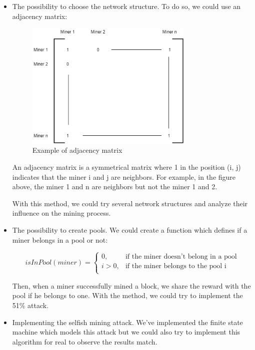 \begin{itemize}
  \item The possibility to choose the network structure. To do so, we could use an adjacency matrix: \newline

  \begin{figure}[ht]
  \centering
  \includegraphics[width=8cm]{Figures/matrix}
  \caption{Example of adjacency matrix}
  \end{figure}
  \medskip

  An adjacency matrix is a symmetrical matrix where 1 in the position (i, j) indicates that the miner i and j are neighbors. For example, in the figure above, the miner 1 and n are neighbors but not the miner 1 and 2. \newline

  With this method, we could try several network structures and analyze their influence on the mining process.

  \item The possibility to create pools. We could create a function which defines if a miner belongs in a pool or not: \newline

  \[
    isInPool(miner) =
    \begin{cases}
      0, & \text{if the miner doesn't belong in a pool}  \\
      i > 0, & \text{if the miner belongs to the pool i} \\
    \end{cases}
  \]
  \medskip

  Then, when a miner successfully mined a block, we share the reward with the pool if he belongs to one. With the method, we could try to implement the 51\% attack.

  \item Implementing the selfish mining attack. We've implemented the finite state machine which models this attack but we could also try to implement this algorithm for real to observe the results match.


\end{itemize}
